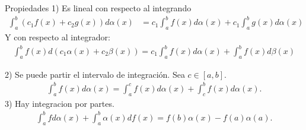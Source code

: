 \documentclass{article}
\begin{document}
	\begin{myframe}{Propiedades}
		1) Es lineal con respecto al integrando
		\begin{equation}
			\begin{aligned}
				 \int_{a}^{b}(c_1f(x)+c_2g(x))d \alpha(x) &= c_1\int_{a}^{b}f(x)d \alpha(x) + c_1\int_{a}^{b}g(x)d \alpha(x)
			\end{aligned}
		\end{equation}
		Y con respecto al integrador:
		\begin{equation}
			\begin{aligned}
				\int_{a}^{b}f(x)d(c_1 \alpha(x) + c_2\beta(x)) = c_1 \int_{a}^{b}f(x)d \alpha(x) + \int_{a}^{b}f(x) d \beta(x)
			\end{aligned}
		\end{equation}

		2) Se puede partir el intervalo de integración. Sea $c \in [a,b]$.
		\begin{equation}
			\begin{aligned}
			 \int_{a}^{b}f(x)d \alpha(x)= \int_{a}^{c}f(x)d \alpha(x) + \int_{c}^{b}f(x)d \alpha(x).
			\end{aligned}
		\end{equation}
		3) Hay integracion por partes.
		\begin{equation}
			\begin{aligned}
				\int_{a}^{b}fd \alpha(x) + \int_{a}^{b} \alpha(x)df(x) = f(b) \alpha(x)- f(a) \alpha(a).
			\end{aligned}
		\end{equation}
	\end{myframe}
	
\end{document}
